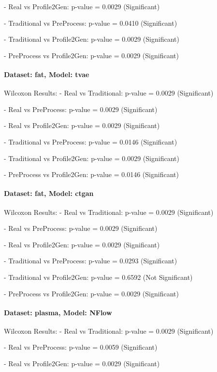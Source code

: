 \documentclass{article}
\theoremstyle{plain}
\theoremstyle{definition}
\theoremstyle{remark}
\begin{document}
- Real vs Profile2Gen: p-value = 0.0029 (Significant)


- Traditional vs PreProcess: p-value = 0.0410 (Significant)


- Traditional vs Profile2Gen: p-value = 0.0029 (Significant)


- PreProcess vs Profile2Gen: p-value = 0.0029 (Significant)



\paragraph{Dataset: fat, Model: tvae}
Wilcoxon Results:
- Real vs Traditional: p-value = 0.0029 (Significant)


- Real vs PreProcess: p-value = 0.0029 (Significant)


- Real vs Profile2Gen: p-value = 0.0029 (Significant)


- Traditional vs PreProcess: p-value = 0.0146 (Significant)


- Traditional vs Profile2Gen: p-value = 0.0029 (Significant)


- PreProcess vs Profile2Gen: p-value = 0.0146 (Significant)



\paragraph{Dataset: fat, Model: ctgan}
Wilcoxon Results:
- Real vs Traditional: p-value = 0.0029 (Significant)


- Real vs PreProcess: p-value = 0.0029 (Significant)


- Real vs Profile2Gen: p-value = 0.0029 (Significant)


- Traditional vs PreProcess: p-value = 0.0293 (Significant)


- Traditional vs Profile2Gen: p-value = 0.6592 (Not Significant)


- PreProcess vs Profile2Gen: p-value = 0.0029 (Significant)



\paragraph{Dataset: plasma, Model: NFlow}
Wilcoxon Results:
- Real vs Traditional: p-value = 0.0029 (Significant)


- Real vs PreProcess: p-value = 0.0059 (Significant)


- Real vs Profile2Gen: p-value = 0.0029 (Significant)
\end{document}
